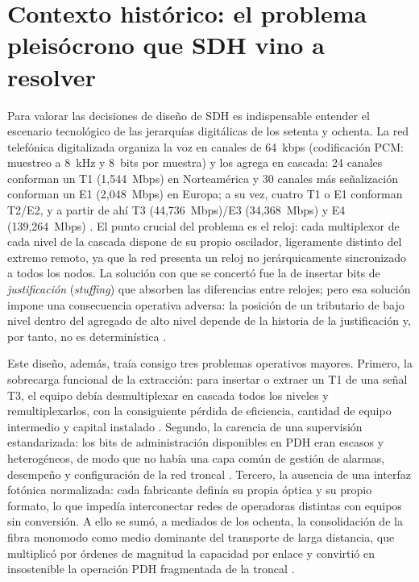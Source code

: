 \documentclass[12pt,a4paper]{article}
\begin{document}
\section{Contexto histórico: el problema pleisócrono que SDH vino a resolver}

Para valorar las decisiones de diseño de SDH es indispensable entender el escenario tecnológico de las jerarquías digitálicas de los setenta y ochenta. La red telefónica digitalizada organiza la voz en canales de 64~kbps (codificación PCM: muestreo a 8~kHz y 8~bits por muestra) y los agrega en cascada: 24 canales conforman un T1 (1{,}544~Mbps) en Norteamérica y 30 canales más señalización conforman un E1 (2{,}048~Mbps) en Europa; a su vez, cuatro T1 o E1 conforman T2/E2, y a partir de ahí T3 (44{,}736~Mbps)/E3 (34{,}368~Mbps) y E4 (139{,}264~Mbps) \cite{stallings2004, tanenbaum2012}. El punto crucial del problema es el reloj: cada multiplexor de cada nivel de la cascada dispone de su propio oscilador, ligeramente distinto del extremo remoto, ya que la red presenta un reloj no jerárquicamente sincronizado a todos los nodos. La solución con que se concertó fue la de insertar bits de \emph{justificación} (\emph{stuffing}) que absorben las diferencias entre relojes; pero esa solución impone una consecuencia operativa adversa: la posición de un tributario de bajo nivel dentro del agregado de alto nivel depende de la historia de la justificación y, por tanto, no es determinística \cite{itug707, tanenbaum2012}.

Este diseño, además, traía consigo tres problemas operativos mayores. Primero, la sobrecarga funcional de la extracción: para insertar o extraer un T1 de una señal T3, el equipo debía desmultiplexar en cascada todos los niveles y remultiplexarlos, con la consiguiente pérdida de eficiencia, cantidad de equipo intermedio y capital instalado \cite{stallings2004}. Segundo, la carencia de una supervisión estandarizada: los bits de administración disponibles en PDH eran escasos y heterogéneos, de modo que no había una capa común de gestión de alarmas, desempeño y configuración de la red troncal \cite{tanenbaum2012, ituG803}. Tercero, la ausencia de una interfaz fotónica normalizada: cada fabricante definía su propia óptica y su propio formato, lo que impedía interconectar redes de operadoras distintas con equipos sin conversión. A ello se sumó, a mediados de los ochenta, la consolidación de la fibra monomodo como medio dominante del transporte de larga distancia, que multiplicó por órdenes de magnitud la capacidad por enlace y convirtió en insostenible la operación PDH fragmentada de la troncal \cite{stallings2004, tanenbaum2012}.
\end{document}
